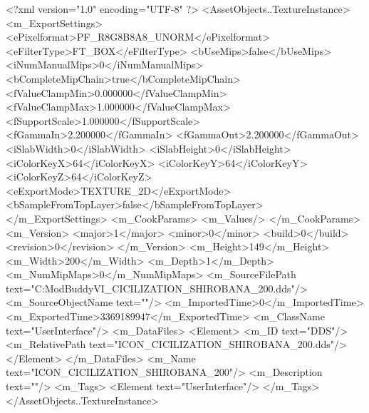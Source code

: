 <?xml version="1.0" encoding="UTF-8" ?>
<AssetObjects..TextureInstance>
	<m_ExportSettings>
		<ePixelformat>PF_R8G8B8A8_UNORM</ePixelformat>
		<eFilterType>FT_BOX</eFilterType>
		<bUseMips>false</bUseMips>
		<iNumManualMips>0</iNumManualMips>
		<bCompleteMipChain>true</bCompleteMipChain>
		<fValueClampMin>0.000000</fValueClampMin>
		<fValueClampMax>1.000000</fValueClampMax>
		<fSupportScale>1.000000</fSupportScale>
		<fGammaIn>2.200000</fGammaIn>
		<fGammaOut>2.200000</fGammaOut>
		<iSlabWidth>0</iSlabWidth>
		<iSlabHeight>0</iSlabHeight>
		<iColorKeyX>64</iColorKeyX>
		<iColorKeyY>64</iColorKeyY>
		<iColorKeyZ>64</iColorKeyZ>
		<eExportMode>TEXTURE_2D</eExportMode>
		<bSampleFromTopLayer>false</bSampleFromTopLayer>
	</m_ExportSettings>
	<m_CookParams>
		<m_Values/>
	</m_CookParams>
	<m_Version>
		<major>1</major>
		<minor>0</minor>
		<build>0</build>
		<revision>0</revision>
	</m_Version>
	<m_Height>149</m_Height>
	<m_Width>200</m_Width>
	<m_Depth>1</m_Depth>
	<m_NumMipMaps>0</m_NumMipMaps>
	<m_SourceFilePath text="C:\Users\asus\Documents\Firaxis ModBuddy\Civilization VI\temppic\ICON_CICILIZATION_SHIROBANA_200.dds"/>
	<m_SourceObjectName text=""/>
	<m_ImportedTime>0</m_ImportedTime>
	<m_ExportedTime>3369189947</m_ExportedTime>
	<m_ClassName text="UserInterface"/>
	<m_DataFiles>
		<Element>
			<m_ID text="DDS"/>
			<m_RelativePath text="ICON_CICILIZATION_SHIROBANA_200.dds"/>
		</Element>
	</m_DataFiles>
	<m_Name text="ICON_CICILIZATION_SHIROBANA_200"/>
	<m_Description text=""/>
	<m_Tags>
		<Element text="UserInterface"/>
	</m_Tags>
</AssetObjects..TextureInstance>

